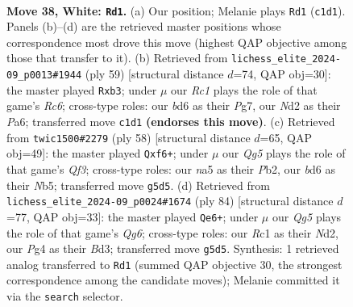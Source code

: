 \documentclass[11pt]{article}
\begin{document}
\clearpage

\begin{figure}[p]\centering
\begin{subfigure}{0.46\textwidth}\centering
\resizebox{\linewidth}{!}{%
\newchessgame
\chessboard[
  setfen={r6r/p2k2pp/3b4/n2p2Q1/p2P2PP/4P2K/1q1N4/2R5 w - - 8 38},
  showmover=false,
  pgfstyle=straightmove, color=movearrow, markmove={c1-d1}
]}
\caption{}
\end{subfigure}\hfill
\begin{subfigure}{0.46\textwidth}\centering
\resizebox{\linewidth}{!}{%
\newchessgame
\chessboard[
  setfen={6k1/4qpp1/p5np/8/1p6/1Nr1P2P/4BPP1/Q2R2K1 b - - 0 30},
  showmover=false,
  pgfstyle=straightmove, color=movearrow, markmove={c3-b3}
]}
\caption{}
\end{subfigure}
\\[4pt]
\begin{subfigure}{0.46\textwidth}\centering
\resizebox{\linewidth}{!}{%
\newchessgame
\chessboard[
  setfen={1rr1qb1k/1pR5/5p1p/pN6/P7/5QP1/1P3PKP/8 w - - 0 30},
  showmover=false,
  pgfstyle=straightmove, color=movearrow, markmove={f3-f6}
]}
\caption{}
\end{subfigure}\hfill
\begin{subfigure}{0.46\textwidth}\centering
\resizebox{\linewidth}{!}{%
\newchessgame
\chessboard[
  setfen={1b3rk1/6p1/2p3Qp/2P5/p7/3B2P1/3N1PPK/2q5 w - - 18 43},
  showmover=false,
  pgfstyle=straightmove, color=movearrow, markmove={g6-e6}
]}
\caption{}
\end{subfigure}
\caption{\textbf{Move 38, White: \texttt{Rd1}.} (a) Our position; Melanie plays \texttt{Rd1} (\texttt{c1d1}). Panels (b)--(d) are the retrieved master positions whose correspondence most drove this move (highest QAP objective among those that transfer to it). (b) Retrieved from \texttt{lichess\_elite\_2024-09\_p0013\#1944} (ply 59) [structural distance $d$=74, QAP obj=30]: the master played \texttt{Rxb3}; under $\mu$ our \emph{Rc1} plays the role of that game's \emph{Rc6}; cross-type roles: our \emph{b}d6 as their \emph{P}g7, our \emph{N}d2 as their \emph{P}a6; transferred move \texttt{c1d1} \textbf{(endorses this move)}. (c) Retrieved from \texttt{twic1500\#2279} (ply 58) [structural distance $d$=65, QAP obj=49]: the master played \texttt{Qxf6+}; under $\mu$ our \emph{Qg5} plays the role of that game's \emph{Qf3}; cross-type roles: our \emph{n}a5 as their \emph{P}b2, our \emph{b}d6 as their \emph{N}b5; transferred move \texttt{g5d5}. (d) Retrieved from \texttt{lichess\_elite\_2024-09\_p0024\#1674} (ply 84) [structural distance $d$=77, QAP obj=33]: the master played \texttt{Qe6+}; under $\mu$ our \emph{Qg5} plays the role of that game's \emph{Qg6}; cross-type roles: our \emph{R}c1 as their \emph{N}d2, our \emph{P}g4 as their \emph{B}d3; transferred move \texttt{g5d5}. Synthesis: 1 retrieved analog transferred to \texttt{Rd1} (summed QAP objective 30, the strongest correspondence among the candidate moves); Melanie committed it via the \texttt{search} selector.}
\label{fig:thought-m74}
\end{figure}
\end{document}
